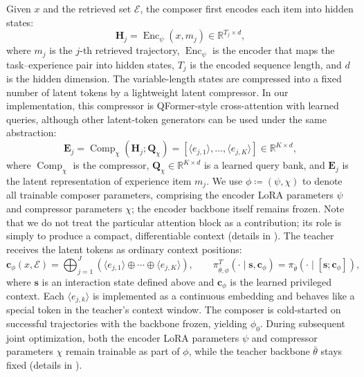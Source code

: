 \documentclass{article} %
\begin{document}
Given $x$ and the retrieved set $\mathcal{E}$, the composer first encodes each item into hidden states:
\begin{equation}
\mathbf{H}_j=\operatorname{Enc}_{\psi}(x,m_j)\in \mathbb{R}^{T_j\times d},
\label{eq:experience-encoder}
\end{equation}
where $m_j$ is the $j$-th retrieved trajectory, $\operatorname{Enc}_{\psi}$ is the encoder that maps the task--experience pair into hidden states, $T_j$ is the encoded sequence length, and $d$ is the hidden dimension.
The variable-length states are compressed into a fixed number of latent tokens by a lightweight latent compressor. In our implementation, this compressor is QFormer-style cross-attention with learned queries, although other latent-token generators can be used under the same abstraction:
\begin{equation}
\mathbf{E}_j=\operatorname{Comp}_{\chi}(\mathbf{H}_j;\mathbf{Q}_{\chi})=[\langle e_{j,1}\rangle,\ldots,\langle e_{j,K}\rangle]\in \mathbb{R}^{K\times d},
\label{eq:latent-composer}
\end{equation}
where $\operatorname{Comp}_{\chi}$ is the compressor, $\mathbf{Q}_{\chi}\in\mathbb{R}^{K\times d}$ is a learned query bank, and $\mathbf{E}_j$ is the latent representation of experience item $m_j$. We use $\phi\coloneqq(\psi,\chi)$ to denote all trainable composer parameters, comprising the encoder LoRA parameters $\psi$ and compressor parameters $\chi$; the encoder backbone itself remains frozen. Note that we do not treat the particular attention block as a contribution; its role is simply to produce a compact, differentiable context (details in ).
The teacher receives the latent tokens as ordinary context positions:
\begin{equation}
\boldsymbol{c}_{\phi}(x,\mathcal{E})=\bigoplus_{j=1}^{J}(\langle e_{j,1}\rangle\oplus\cdots\oplus\langle e_{j,K}\rangle),\qquad
\pi_{\bar{\theta},\phi}^{T}(\cdot\mid \boldsymbol{s},\boldsymbol{c}_{\phi})=\pi_{\bar{\theta}}(\cdot\mid [\boldsymbol{s};\boldsymbol{c}_{\phi}]),
\label{eq:latent-context-concat}
\end{equation}
where $\boldsymbol{s}$ is an interaction state defined above and $\boldsymbol{c}_{\phi}$ is the learned privileged context. Each $\langle e_{j,k}\rangle$ is implemented as a continuous embedding and behaves like a special token in the teacher's context window.
The composer is cold-started on successful trajectories with the backbone frozen, yielding $\phi_0$. During subsequent joint optimization, both the encoder LoRA parameters $\psi$ and compressor parameters $\chi$ remain trainable as part of $\phi$, while the teacher backbone $\bar{\theta}$ stays fixed (details in ).
\end{document}

